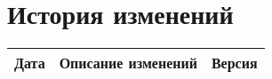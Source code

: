 \chapter*{История изменений}

\begin{center}
    \begin{tabular}{|c|c|c|}
        \hline
	    Дата & Описание изменений & Версия\\
        \hline
    \end{tabular}
\end{center}